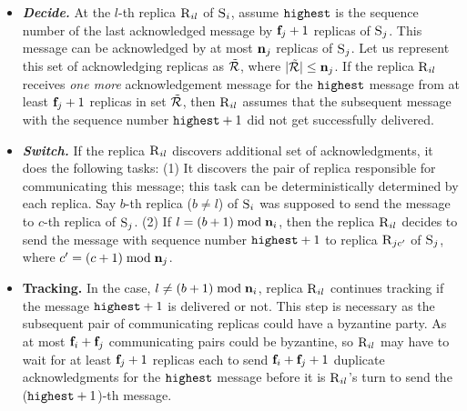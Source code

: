 \begin{itemize}[wide]
\item {\bf \em Decide.}
At the $l$-th replica $\textsc{R}_{{i}{l}}$ of \RSM{} $\textsc{S}_{i}$, assume $\texttt{highest}{}$ is the sequence number of the 
last acknowledged message by $\textbf{f}_{j}+1$ replicas of \RSM{} $\textsc{S}_{j}$.
This message can be acknowledged by at most $\textbf{n}_{j}$ replicas of \RSM{} $\textsc{S}_{j}$.
Let us represent this set of acknowledging replicas as $\tilde{\mathcal{R}}{}$, where $\lvert \tilde{\mathcal{R}} \rvert \le \textbf{n}_{j}$.
% 
If the replica $\textsc{R}_{{i}{l}}$ receives {\em one more} acknowledgement message for the $\texttt{highest}{}$ 
message from at least $\textbf{f}_{j}+1$ replicas in set $\tilde{\mathcal{R}}{}$, then $\textsc{R}_{{i}{l}}$ assumes that the subsequent message with the 
sequence number $\texttt{highest} + 1$ did not get successfully delivered.



\item {\bf \em Switch.}
If the replica $\textsc{R}_{{i}{l}}$ discovers additional set of acknowledgments, it does the following tasks:
(1) It discovers the pair of replica responsible for communicating this message; this task can be deterministically determined by each replica.
Say $b$-th replica ($b \neq l$) of \RSM{} $\textsc{S}_{i}$ was supposed to send the message to $c$-th replica of \RSM{} $\textsc{S}_{j}$.
(2) If $l = (b+1) \bmod \textbf{n}_{i}$, then the replica $\textsc{R}_{{i}{l}}$ decides to send the message with sequence number $\texttt{highest}+1$ 
to replica $\textsc{R}_{{j}{c'}}$ of \RSM{} $\textsc{S}_{j}$, where $c' = (c+1) \bmod \textbf{n}_{j}$.


\item {\bf Tracking.}
In the case, $l \neq (b+1) \bmod \textbf{n}_{i}$, replica $\textsc{R}_{{i}{l}}$ continues tracking if the message 
$\texttt{highest}+1$ is delivered or not.
This step is necessary as the subsequent pair of communicating replicas could have a byzantine party. 
As at most $\textbf{f}_{i}+\textbf{f}_{j}$ communicating pairs could be byzantine, so $\textsc{R}_{{i}{l}}$ 
may have to wait for at least $\textbf{f}_{j}+1$ replicas each to send $\textbf{f}_{i}+\textbf{f}_{j}+1$ duplicate acknowledgments for the $\texttt{highest}{}$ message 
before it is $\textsc{R}_{{i}{l}}$'s turn to send the ($\texttt{highest}+1$)-th message.


\end{itemize}
